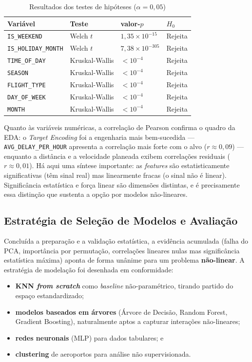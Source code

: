 \documentclass[conference]{IEEEtran}
\begin{document}
\begin{table}[h]
\centering
\caption{Resultados dos testes de hipóteses ($\alpha = 0{,}05$)}
\label{tab:hypo}
\setlength{\tabcolsep}{3pt}
\begin{tabular}{p{2.4cm}p{2.1cm}p{1.5cm}p{1.0cm}}
\toprule
\textbf{Variável} & \textbf{Teste} & \textbf{valor-$p$} & \textbf{$H_0$} \\
\midrule
\texttt{IS\_WEEKEND}       & Welch $t$        & $1{,}35\times10^{-15}$  & Rejeita \\
\texttt{IS\_HOLIDAY\_MONTH}& Welch $t$        & $7{,}38\times10^{-305}$ & Rejeita \\
\texttt{TIME\_OF\_DAY}     & Kruskal-Wallis   & $<10^{-4}$              & Rejeita \\
\texttt{SEASON}            & Kruskal-Wallis   & $<10^{-4}$              & Rejeita \\
\texttt{FLIGHT\_TYPE}      & Kruskal-Wallis   & $<10^{-4}$              & Rejeita \\
\texttt{DAY\_OF\_WEEK}     & Kruskal-Wallis   & $<10^{-4}$              & Rejeita \\
\texttt{MONTH}             & Kruskal-Wallis   & $<10^{-4}$              & Rejeita \\
\bottomrule
\end{tabular}
\end{table}

Quanto às variáveis numéricas, a correlação de Pearson confirma o quadro da
EDA: o \textit{Target Encoding} foi a engenharia mais bem-sucedida —
\texttt{AVG\_DELAY\_PER\_HOUR} apresenta a correlação mais forte com o alvo
($r \approx 0{,}09$) — enquanto a distância e a velocidade planeada exibem
correlações residuais ($r \approx 0{,}01$). Há aqui uma síntese importante: as
\textit{features} são estatisticamente significativas (têm sinal real) mas
linearmente fracas (o sinal não é linear). Significância estatística e força
linear são dimensões distintas, e é precisamente essa distinção que sustenta a
opção por modelos não-lineares.

\subsection{Estratégia de Seleção de Modelos e Avaliação}
Concluída a preparação e a validação estatística, a evidência acumulada
(falha do PCA, importância por permutação, correlações lineares nulas mas
significância estatística máxima) aponta de forma unânime para um problema
\textbf{não-linear}. A estratégia de modelação foi desenhada em conformidade:
\begin{itemize}
\item \textbf{KNN \textit{from scratch}} como \textit{baseline} não-paramétrico,
      tirando partido do espaço estandardizado;
\item \textbf{modelos baseados em árvores} (Árvore de Decisão, Random Forest,
      Gradient Boosting), naturalmente aptos a capturar interações
      não-lineares;
\item \textbf{redes neuronais} (MLP) para dados tabulares; e
\item \textbf{clustering} de aeroportos para análise não supervisionada.
\end{itemize}
\end{document}
